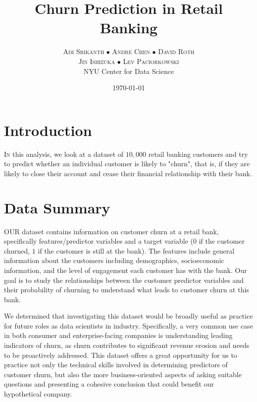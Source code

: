 \documentclass[twoside,twocolumn]{article}
\title{Churn Prediction in Retail Banking} %
\author{%
\textsc{Adi Srikanth $\bullet$ Andre Chen $\bullet$ David Roth} \\[1ex] %
\textsc{Jin Ishizuka $\bullet$ Lev Paciorkowski} \\[1ex] %
\normalsize NYU Center for Data Science \\ %
}
\date{\today} %
\begin{document}
\maketitle

\section{Introduction}

\lettrine[nindent=0em,lines=2]{I} n this analysis, we look at a dataset of $10,000$ retail banking customers and try to predict whether an individual customer is likely to "churn", that is, if they are likely to close their account and cease their financial relationship with their bank.

\section{Data Summary}

\lettrine[nindent=0em,lines=2]{O}UR dataset contains information on customer churn at a retail bank, specifically features/predictor variables and a target variable ($0$ if the customer churned, $1$ if the customer is still at the bank). The features include general information about the customers including demographics, socioeconomic information, and the level of engagement each customer has with the bank. Our goal is to study the relationships between the customer predictor variables and their probability of churning to understand what leads to customer churn at this bank.
    
We determined that investigating this dataset would be broadly useful as practice for future roles as data scientists in industry. Specifically, a very common use case in both consumer and enterprise-facing companies is understanding leading indicators of churn, as churn contributes to significant revenue erosion and needs to be proactively addressed. This dataset offers a great opportunity for us to practice not only the technical skills involved in determining predictors of customer churn, but also the more business-oriented aspects of asking suitable questions and presenting a cohesive conclusion that could benefit our hypothetical company.
\end{document}
